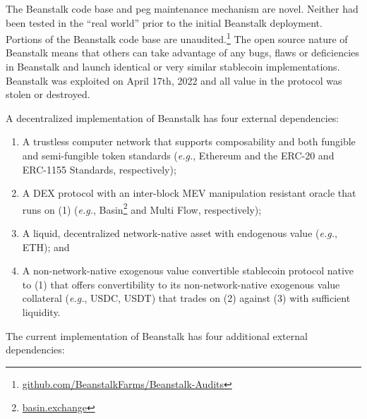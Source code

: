 \documentclass[tikz]{article}
\newcommand{\term}[1]{\textsl{#1}}
\newcommand{\fref}[1]{\footnote{\href{http://#1}{#1}}}
\begin{document}
The Beanstalk code base and peg maintenance mechanism are novel. Neither had been tested in the “real world” prior to the initial Beanstalk deployment. Portions of the Beanstalk code base are unaudited.\footnote{\href{https://github.com/BeanstalkFarms/Beanstalk-Audits}{github.com/BeanstalkFarms/Beanstalk-Audits}} The open source nature of Beanstalk means that others can take advantage of any bugs, flaws or deficiencies in Beanstalk and launch identical or very similar stablecoin implementations. Beanstalk was exploited on April 17th, 2022 and all value in the protocol was stolen or destroyed.

A decentralized implementation of Beanstalk has four external dependencies:

\begin{enumerate}[label=(\arabic*)]
  \item A trustless computer network that supports composability and both fungible and semi-fungible token standards (\term{e.g.}, Ethereum and the ERC-20 and ERC-1155 Standards, respectively);

  \item A DEX protocol with an inter-block MEV manipulation resistant oracle that runs on (1) (\term{e.g.}, Basin\fref{basin.exchange} and Multi Flow, respectively); 

  \item A liquid, decentralized network-native asset with endogenous value (\term{e.g.}, ETH); and

  \item A non-network-native exogenous value convertible stablecoin protocol native to (1) that offers convertibility to its non-network-native exogenous value collateral (\term{e.g.}, USDC, USDT) that trades on (2) against (3) with sufficient liquidity.
\end{enumerate}

The current implementation of Beanstalk has four additional external dependencies: 
\end{document}
